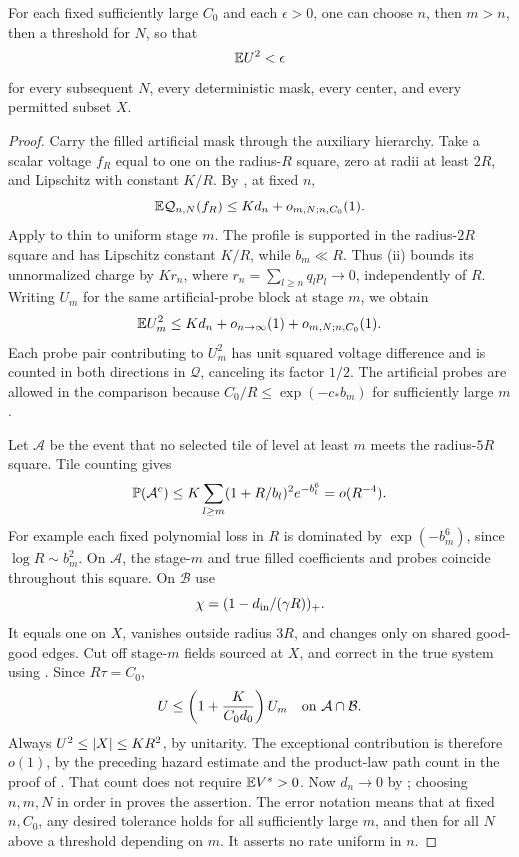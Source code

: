 \begin{lemma}\label{boot:return}
For each fixed sufficiently large \(C_0\) and each \(\epsilon>0\),
one can choose \(n\), then \(m>n\), then a threshold for \(N\), so that
\[
                          \mathbb E U^2<\epsilon
\]
for every subsequent \(N\), every deterministic mask, every center,
and every permitted subset \(X\).
\end{lemma}

\begin{proof}
Carry the filled artificial mask through the auxiliary hierarchy.
Take a scalar voltage \(f_R\) equal to one on the radius-\(R\) square,
zero at radii at least \(2R\), and Lipschitz with constant \(K/R\).
By , at fixed \(n\),
\[
 \mathbb E\mathcal Q_{n,N}(f_R)\le Kd_n+o_{m,N;n,C_0}(1).
\]
Apply  to thin to uniform stage \(m\).
The profile is supported in the radius-\(2R\) square and has Lipschitz
constant \(K/R\), while \(b_m\ll R\). Thus
(ii) bounds its unnormalized charge by \(K r_n\),
where \(r_n=\sum_{l\ge n}q_lp_l\to0\), independently of \(R\).
Writing \(U_m\) for the same artificial-probe block at stage \(m\),
we obtain
\begin{equation}\label{boot:return-stage}
 \mathbb E U_m^2
    \le Kd_n+o_{n\to\infty}(1)+o_{m,N;n,C_0}(1).
\end{equation}
Each probe pair contributing to \(U_m^2\) has unit squared voltage difference and is
counted in both directions in \(\mathcal Q\), canceling its factor
\(1/2\). The artificial probes are allowed in the comparison because
\(C_0/R\le\exp(-c_*b_m)\) for sufficiently large \(m\).

Let \(\mathcal A\) be the event that no selected tile of level at least
\(m\) meets the radius-\(5R\) square. Tile counting gives
\[
 \mathbb P(\mathcal A^c)
       \le K\sum_{l\ge m}(1+R/b_l)^2 e^{-b_l^6}
       =o(R^{-4}).
\]
For example each fixed polynomial loss in \(R\) is dominated by
\(\exp(-b_m^6)\), since \(\log R\sim b_m^2\).
On \(\mathcal A\), the stage-\(m\) and true filled coefficients and
probes coincide throughout this square. On \(\mathcal B\) use
\[
                 \chi=(1-d_{\rm in}/(\gamma R))_+.
\]
It equals one on \(X\), vanishes outside radius \(3R\), and changes
only on shared good-good edges. Cut off stage-\(m\) fields sourced at
\(X\), and correct in the true system using
. Since \(R\tau=C_0\),
\[
                   U\le\left(1+\frac K{C_0d_0}\right)U_m
                   \quad\hbox{on }\mathcal A\cap\mathcal B.
\]
Always \(U^2\le\left\lvert X\right\rvert\le K R^2\), by unitarity. The exceptional
contribution is therefore \(o(1)\), by the preceding hazard estimate
and the product-law path count in the proof of .
That count does not require \(\mathbb E V^s>0\). Now \(d_n\to0\) by
; choosing \(n,m,N\) in order in
 proves the assertion. The error notation means
that at fixed \(n,C_0\), any desired tolerance holds for all sufficiently
large \(m\), and then for all \(N\) above a threshold depending on \(m\).
It asserts no rate uniform in \(n\).
\end{proof}

